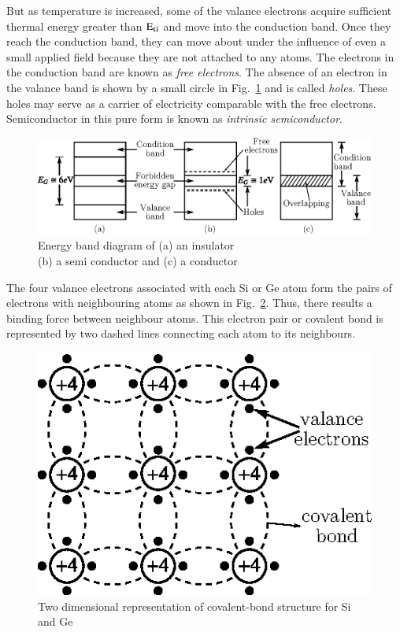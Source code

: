 But as temperature is increased, some of the valance electrons acquire sufficient thermal energy greater than $\textrm{E}_{\textrm{G}}$ and move into the conduction band. Once they reach the conduction band, they can move about under the influence of even a small applied field because they are not attached to any atoms. The electrons in the conduction band are known as {\em free electrons}. The absence of an electron in the valance band is shown by a small circle in Fig.~\ref{fig1.3} and is called {\em holes}. These holes may serve as a carrier of electricity comparable with the free electrons. Semiconductor in this pure form is known as {\em intrinsic semiconductor}.
\begin{figure}[H]
\centering
\includegraphics[scale=1.05]{chap1/fig1.3.eps}
\caption{Energy band diagram of (a) an insulator\\ (b) a semi conductor and (c) a conductor}\label{fig1.3}
\end{figure}

\smallskip
The four valance electrons associated with each Si or Ge atom form the pairs of electrons with neighbouring atoms as shown in Fig.~\ref{fig1.4}. Thus, there results a binding force between neighbour atoms. This electron pair or covalent bond is represented by two dashed lines connecting each atom to its neighbours.
\begin{figure}[H]
\centering
\includegraphics{chap1/fig1.4.eps}
\caption{Two dimensional representation of covalent-bond structure for Si and Ge}\label{fig1.4}
\end{figure}

